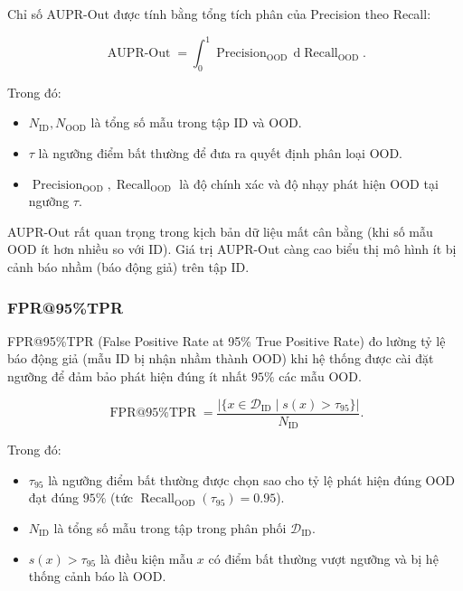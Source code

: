 Chỉ số AUPR-Out được tính bằng tổng tích phân của Precision theo Recall:

\begin{equation}
    \operatorname{AUPR\text{-}Out} = \int_{0}^{1} \operatorname{Precision}_{\mathrm{OOD}} \,\mathrm{d}\operatorname{Recall}_{\mathrm{OOD}}.
    \label{eq:ch4_aupr_out}
\end{equation}

Trong đó:
\begin{itemize}
    \item $N_{\mathrm{ID}}, N_{\mathrm{OOD}}$ là tổng số mẫu trong tập ID và OOD.
    \item $\tau$ là ngưỡng điểm bất thường để đưa ra quyết định phân loại OOD.
    \item $\operatorname{Precision}_{\mathrm{OOD}}, \operatorname{Recall}_{\mathrm{OOD}}$ là độ chính xác và độ nhạy phát hiện OOD tại ngưỡng $\tau$.
\end{itemize}

AUPR-Out rất quan trọng trong kịch bản dữ liệu mất cân bằng (khi số mẫu OOD ít hơn nhiều so với ID). Giá trị AUPR-Out càng cao biểu thị mô hình ít bị cảnh báo nhầm (báo động giả) trên tập ID.

\subsubsection{FPR@95\%TPR}

FPR@95\%TPR \cite{Liang2018ODIN,Liu2020EnergyOOD} (False Positive Rate at 95\% True Positive Rate) đo lường tỷ lệ báo động giả (mẫu ID bị nhận nhầm thành OOD) khi hệ thống được cài đặt ngưỡng để đảm bảo phát hiện đúng ít nhất $95\%$ các mẫu OOD.

\begin{equation}
    \operatorname{FPR@95\%TPR} = \frac{|\{x \in \mathcal{D}_{\mathrm{ID}} \mid s(x) > \tau_{95}\}|}{N_{\mathrm{ID}}}.
    \label{eq:ch4_fpr95}
\end{equation}

Trong đó:
\begin{itemize}
    \item $\tau_{95}$ là ngưỡng điểm bất thường được chọn sao cho tỷ lệ phát hiện đúng OOD đạt đúng $95\%$ (tức $\operatorname{Recall}_{\mathrm{OOD}}(\tau_{95}) = 0.95$).
    \item $N_{\mathrm{ID}}$ là tổng số mẫu trong tập trong phân phối $\mathcal{D}_{\mathrm{ID}}$.
    \item $s(x) > \tau_{95}$ là điều kiện mẫu $x$ có điểm bất thường vượt ngưỡng và bị hệ thống cảnh báo là OOD.
\end{itemize}

